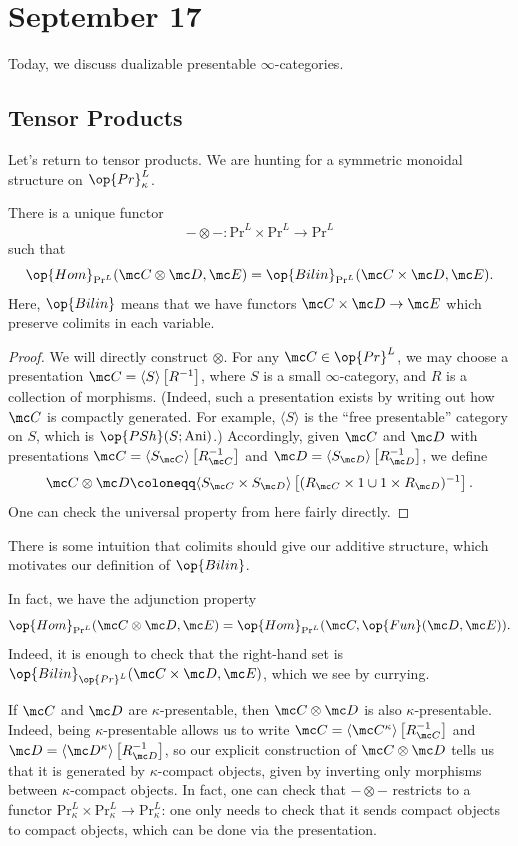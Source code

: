 \documentclass[../notes.tex]{subfiles}
\begin{document}
\section{September 17}
Today, we discuss dualizable presentable $\infty$-categories.

\subsection{Tensor Products}
Let's return to tensor products. We are hunting for a symmetric monoidal structure on $\op{Pr}^L_\kappa$.
\begin{theorem}
	There is a unique functor
	\[-\otimes-\colon\mathrm{Pr}^L\times\mathrm{Pr}^L\to\mathrm{Pr}^L\]
	such that
	\[\op{Hom}_{\mathrm{Pr}^L}(\mc C\otimes\mc D,\mc E)=\op{Bilin}_{\mathrm{Pr}^L}(\mc C\times\mc D,\mc E).\]
	Here, $\op{Bilin}$ means that we have functors $\mc C\times\mc D\to\mc E$ which preserve colimits in each variable.
\end{theorem}
\begin{proof}
	We will directly construct $\otimes$. For any $\mc C\in\op{Pr}^L$, we may choose a presentation $\mc C=\langle S\rangle\left[R^{-1}\right]$, where $S$ is a small $\infty$-category, and $R$ is a collection of morphisms. (Indeed, such a presentation exists by writing out how $\mc C$ is compactly generated. For example, $\langle S\rangle$ is the ``free presentable'' category on $S$, which is $\op{PSh}(S;\mathrm{Ani})$.) Accordingly, given $\mc C$ and $\mc D$ with presentations $\mc C=\langle S_{\mc C}\rangle\left[R_{\mc C}^{-1}\right]$ and $\mc D=\langle S_{\mc D}\rangle\left[R_{\mc D}^{-1}\right]$, we define
	\[\mc C\otimes\mc D\coloneqq\langle S_{\mc C}\times S_{\mc D}\rangle\left[(R_{\mc C}\times1\cup1\times R_{\mc D})^{-1}\right].\]
	One can check the universal property from here fairly directly.
\end{proof}
\begin{remark}
	There is some intuition that colimits should give our additive structure, which motivates our definition of $\op{Bilin}$.
\end{remark}
\begin{remark}
	In fact, we have the adjunction property
	\[\op{Hom}_{\mathrm{Pr}^L}(\mc C\otimes\mc D,\mc E)=\op{Hom}_{\mathrm{Pr}^L}(\mc C,\op{Fun}(\mc D,\mc E)).\]
	Indeed, it is enough to check that the right-hand set is $\op{Bilin}_{\op{Pr}^L}(\mc C\times\mc D,\mc E)$, which we see by currying.
\end{remark}
\begin{remark}
	If $\mc C$ and $\mc D$ are $\kappa$-presentable, then $\mc C\otimes\mc D$ is also $\kappa$-present\-able. Indeed, being $\kappa$-present\-able allows  us to write $\mc C=\langle\mc C^\kappa\rangle\left[R_{\mc C}^{-1}\right]$ and $\mc D=\langle\mc D^\kappa\rangle\left[R_{\mc D}^{-1}\right]$, so our explicit construction of $\mc C\otimes\mc D$ tells us that it is generated by $\kappa$-compact objects, given by inverting only morphisms between $\kappa$-compact objects. In fact, one can check that $-\otimes-$ restricts to a functor $\mathrm{Pr}^L_\kappa\times\mathrm{Pr}^L_\kappa\to\mathrm{Pr}^L_\kappa$: one only needs to check that it sends compact objects to compact objects, which can be done via the presentation.
\end{remark}
\end{document}
